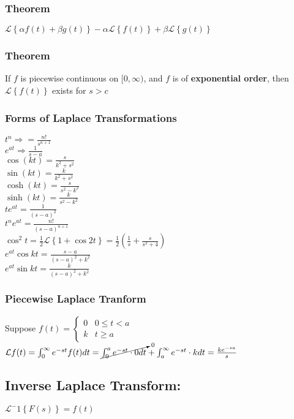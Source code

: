 \documentclass{article}
\begin{document}
\subsubsection{Theorem}
$\mathcal{L}\left\{\alpha f(t) + \beta g(t)\right\}-\alpha\mathcal{L}\left\{f(t)\right\}+\beta\mathcal{L}\left\{g(t)\right\}$
\subsubsection{Theorem}
If $f$ is piecewise continuous on $[0,\infty)$, and $f$ is of \textbf{exponential order}, then $\mathcal{L}\left\{f(t)\right\}$ exists for $s>c$
\subsubsection{Forms of Laplace Transformations}
$t^n \Rightarrow = \frac{n!}{s^{n+1}}$
\\ $e^{at} \Rightarrow \frac{1}{s-a}$
\\ $\cos(kt) = \frac{s}{k^2+s^2}$
\\ $\sin(kt) = \frac{k}{k^2+s^2}$
\\ $\cosh(kt) = \frac{s}{s^2-k^2}$
\\ $\sinh(kt) = \frac{k}{s^2-k^2}$
\\ $te^{at} = \frac{1}{(s-a)^2}$
\\ $t^ne^{at} = \frac{n!}{(s-a)^{n+1}}$
\\ $\cos^2t=\frac{1}{2} \mathcal{L} \left\{1+\cos 2t \right\} = \frac{1}{2}\left(\frac{1}{s}+\frac{s}{s^2+4}\right)$
\\ $e^{at}\cos kt = \frac{s-a}{(s-a)^2+k^2}$
\\ $e^{at}\sin kt = \frac{k}{(s-a)^2+k^2}$
\subsubsection{Piecewise Laplace Tranform}
Suppose $f(t) = \begin{cases}
    0 & 0 \leq t < a
    \\k &  t \geq a
\end{cases}$
$\mathcal{L}f(t) = \int_{0}^{\infty}e^{-st}f(t)dt = \cancelto{0}{\int_{0}^{a}e^{-st}\cdot 0 dt} + \int_{a}^{\infty} e^{-st}\cdot k dt = \frac{ke^{-sa}}{s}$
\subsection{Inverse Laplace Transform:}
$\mathcal{L}^-1 \left\{F(s)\right\}=f(t)$
\end{document}
